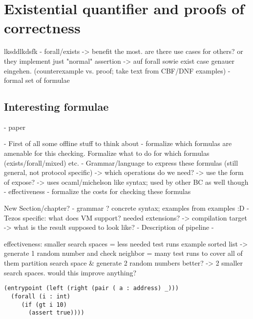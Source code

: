 \section{Existential quantifier and proofs of correctness}
lksddlkdsfk
- forall/exists -> benefit the most. are there use cases for others? or they implement just "normal" assertion
	-> auf forall sowie exist case genauer eingehen. (counterexample vs. proof; take text from CBF/DNF examples)
- formal set of formulae

\subsection{Interesting formulae}\label{sec:example_formulae}
- paper


- First of all some offline stuff to think about - formalize which formulas are amenable for this checking. Formalize what to do for which formulas (exists/forall/mixed) etc.
- Grammar/language to express these formulas (still general, not protocol specific)
	-> which operations do we need?
	-> use the form of expose?
	-> uses ocaml/michelson like syntax; used by other BC as well though
- effectiveness
- formalize the costs for checking these formulas



New Section/chapter? %
- grammar ? concrete syntax; examples from examples :D
- Tezos specific: what does VM support? needed extensions?
	-> compilation target -> what is the result supposed to look like?
- Description of pipeline
- 



effectiveness:
smaller search spaces = less needed test runs
example sorted list -> generate 1 random number and check neighbor = many test runs to cover all of them
partition search space \& generate 2 random numbers better? -> 2 smaller search spaces. would this improve anything?



\begin{lstlisting}[numbers=none, language=Assertion]
(entrypoint (left (right (pair ( a : address) _)))
  (forall (i : int)
     (if (gt i 10)
       (assert true))))
\end{lstlisting}